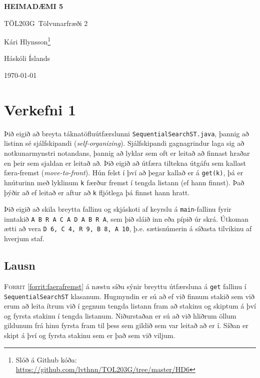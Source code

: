\documentclass[12pt, a4paper, hidelinks]{article}
\newcommand{\doctitle}{\uppercase{Heimadæmi 5}}
\newcommand{\coursename}{Tölvunarfræði 2}
\newcommand{\coursenum}{TÖL203G}
\begin{document}
\thispagestyle{plain}
\centerline{\bfseries\Large\doctitle}
\medskip
\centerline{\large\coursenum\ \coursename}
\bigskip

\centerline{\large Kári Hlynsson\footnote{Slóð á Github kóða: \url{https://github.com/lvthnn/TOL203G/tree/master/HD6}}}
\bigskip
\centerline{Háskóli Íslands}
\medskip
\centerline{\today}

\section*{Verkefni 1}
Þið eigið að breyta táknatöfluútfærslunni \texttt{SequentialSearchST.java}, þannig að
listinn sé sjálfskipandi (\emph{self-organizing}). Sjálfskipandi gagnagrindur laga sig
að notkunarmynstri notandans, þannig að lyklar sem oft er leitað að finnast hraðar en
þeir sem sjaldan er leitað að. Þið eigið að útfæra tiltekna útgáfu sem kallast færa-fremst
(\emph{move-to-front}). Hún felst í því að þegar kallað er á \texttt{get(k)}, þá er hnúturinn
með lyklinum \texttt{k} færður fremst í tengda listann (ef hann finnst). Það þýðir að ef leitað
er aftur að \texttt{k} fljótlega þá finnst hann hratt.

Þið eigið að skila breytta fallinu  og skjáskoti af keyrslu á \texttt{main}-fallinu fyrir
inntakið \texttt{A B R A C A D A B R A}, sem þið sláið inn eða pípið úr skrá. Útkoman ætti að vera
\texttt{D 6, C 4, R 9, B 8, A 10}, þ.e. sætisnúmerin á síðasta tilvikinu af hverjum staf.

\subsection*{Lausn}
\textsc{Forrit} \ref{forrit:faerafremst} á næstu síðu sýnir breyttu útfærsluna á \texttt{get} fallinu í \texttt{SequentialSearchST}
klasanum. Hugmyndin er sú að ef við finnum stakið sem við erum að leita ítrum við í gegnum tengda listann fram
að stakinu og skiptum á því og fyrsta stakinu í tengda listanum. Niðurstaðan er sú að við hliðrum öllum gildunum
frá hinu fyrsta fram til þess sem gildið sem var leitað að er í. Síðan er skipt á því og fyrsta stakinu sem er það
sem við viljum.
\end{document}

